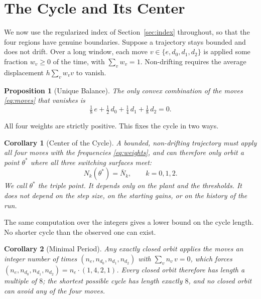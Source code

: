 \documentclass[letterpaper, 10pt, conference, twocolumn]{ieeeconf}
\newtheorem{proposition}{Proposition}
\newtheorem{corollary}{Corollary}
\newcommand{\Nbar}{\bar{N}}
\begin{document}
\section{The Cycle and Its Center}
\label{sec:cycle}

We now use the regularized index of Section~\ref{sec:index} throughout, so
that the four regions have genuine boundaries. Suppose a trajectory stays
bounded and does not drift. Over a long window,
each move $v \in \{e, d_0, d_1, d_2\}$ is applied some fraction $w_v \ge 0$ of
the time, with $\sum_v w_v = 1$. Non-drifting requires the average
displacement $h \sum_v w_v v$ to vanish.

\begin{proposition}[Unique Balance]
\label{prop:balance}
The only convex combination of the moves \eqref{eq:moves} that vanishes is
\begin{equation}
\tfrac{1}{8}\, e + \tfrac{1}{2}\, d_0 + \tfrac{1}{4}\, d_1
+ \tfrac{1}{8}\, d_2 = 0.
\label{eq:weights}
\end{equation}
\end{proposition}

All four weights are strictly positive. This fixes the cycle in two ways.

\begin{corollary}[Center of the Cycle]
\label{cor:triple}
A bounded, non-drifting trajectory must apply all four moves with the
frequencies \eqref{eq:weights}, and can therefore only orbit a point
$\theta^*$ where all three switching surfaces meet:
\begin{equation}
N_k(\theta^*) = \Nbar_k, \qquad k = 0, 1, 2.
\label{eq:triplepoint}
\end{equation}
We call $\theta^*$ the \emph{triple point}. It depends only on the plant and
the thresholds. It does not depend on the step size, on the starting gains, or
on the history of the run.
\end{corollary}

The same computation over the integers gives a lower bound on the cycle
length. No shorter cycle than the observed one can exist.

\begin{corollary}[Minimal Period]
\label{cor:period}
Any exactly closed orbit applies the moves an integer number of times
$(n_e, n_{d_0}, n_{d_1}, n_{d_2})$ with $\sum_v n_v\, v = 0$, which forces
$(n_e, n_{d_0}, n_{d_1}, n_{d_2}) = n_e \cdot (1, 4, 2, 1)$. Every closed
orbit therefore has length a multiple of $8$; the shortest possible cycle
has length exactly $8$, and no closed orbit can avoid any of the four moves.
\end{corollary}
\end{document}
